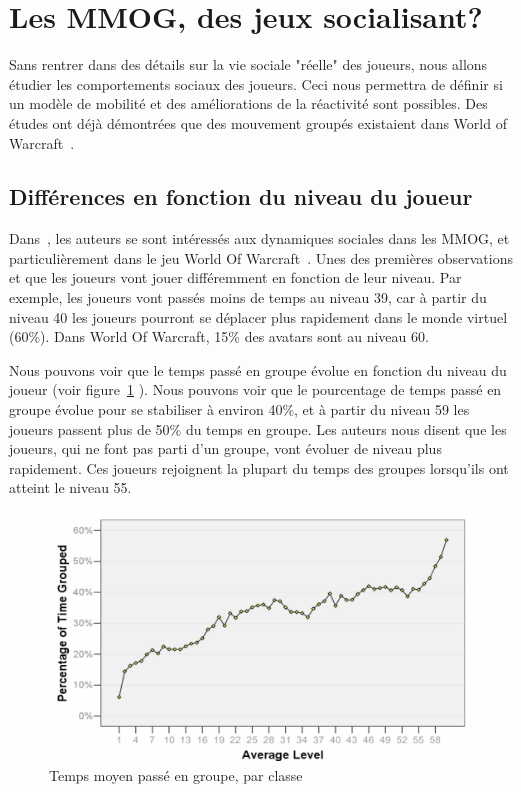 \documentclass[11pt,a4paper]{article}
\begin{document}
\section{Les MMOG, des jeux socialisant?}
Sans rentrer dans des détails sur la vie sociale "réelle" des joueurs, nous allons étudier les comportements sociaux des joueurs. Ceci nous permettra de définir si un modèle de mobilité et des améliorations de la réactivité sont possibles. Des études ont déjà démontrées que des mouvement groupés existaient dans World of Warcraft~\cite{15141312}.
\subsection{Différences en fonction du niveau du joueur}
Dans~\cite{1124834}, les auteurs se sont intéressés aux dynamiques sociales dans les MMOG, et particulièrement dans le jeu World Of Warcraft~\cite{wow}. Unes des premières observations et que les joueurs vont jouer différemment en fonction de leur niveau. Par exemple, les joueurs vont passés moins de temps au niveau 39, car à partir du niveau 40 les joueurs pourront se déplacer plus rapidement dans le monde virtuel (60\%). Dans World Of Warcraft, 15\% des avatars sont au niveau 60.

\par Nous pouvons voir que le temps passé en groupe évolue en fonction du niveau du joueur (voir figure~\ref{timespentgroup} ). Nous pouvons voir que le pourcentage de temps passé en groupe évolue pour se stabiliser à environ 40\%, et à partir du niveau 59 les joueurs passent plus de 50\% du temps en groupe. Les auteurs nous disent que les joueurs, qui ne font pas parti d'un groupe, vont évoluer de niveau plus rapidement. Ces joueurs rejoignent la plupart du temps des groupes lorsqu'ils ont atteint le niveau 55. 
	\begin{figure}[!h]
        \centering
        \includegraphics[scale=0.95]{./images/timespentgroup.png}
        \caption{Temps moyen passé en groupe, par classe}
        \label{timespentgroup}
        \end{figure}
\end{document}
